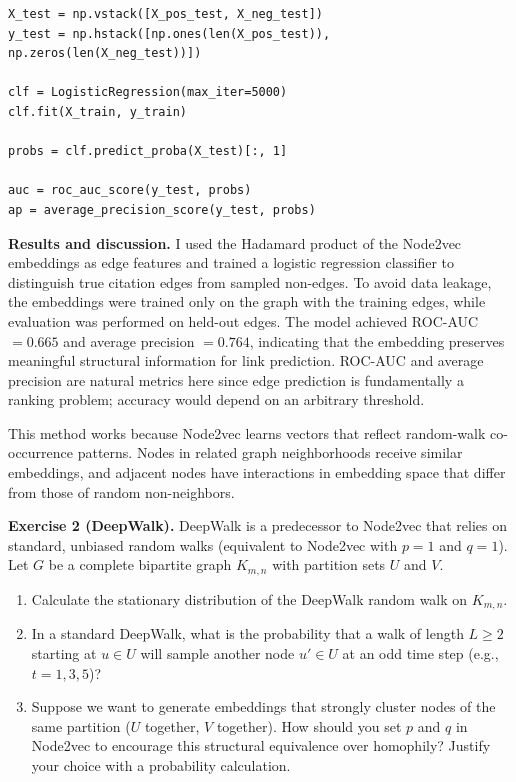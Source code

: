 \documentclass{article}
\begin{document}
\begin{tcolorbox}[colback=white, colframe=black!75, breakable, title=\textbf{Solution to Exercise 1}]
\begin{lstlisting}[style=python2]
X_test = np.vstack([X_pos_test, X_neg_test])
y_test = np.hstack([np.ones(len(X_pos_test)), np.zeros(len(X_neg_test))])

clf = LogisticRegression(max_iter=5000)
clf.fit(X_train, y_train)

probs = clf.predict_proba(X_test)[:, 1]

auc = roc_auc_score(y_test, probs)
ap = average_precision_score(y_test, probs)
\end{lstlisting}

\medskip
\textbf{Results and discussion.} I used the Hadamard product of the Node2vec embeddings as edge features and trained a logistic regression classifier to distinguish true citation edges from sampled non-edges. To avoid data leakage, the embeddings were trained only on the graph with the training edges, while evaluation was performed on held-out edges. The model achieved ROC-AUC $= 0.665$ and average precision $= 0.764$, indicating that the embedding preserves meaningful structural information for link prediction. ROC-AUC and average precision are natural metrics here since edge prediction is fundamentally a ranking problem; accuracy would depend on an arbitrary threshold.

This method works because Node2vec learns vectors that reflect random-walk co-occurrence patterns. Nodes in related graph neighborhoods receive similar embeddings, and adjacent nodes have interactions in embedding space that differ from those of random non-neighbors.
\end{tcolorbox}

\vspace{8pt}

\begin{tcolorbox}[colback = gray!16, enhanced, boxrule=0pt, frame hidden, sharp corners, borderline west={3pt}{-1.5pt}{black!80}, breakable]
\textbf{Exercise 2 (DeepWalk).} DeepWalk is a predecessor to Node2vec that relies on standard, unbiased random walks (equivalent to Node2vec with $p=1$ and $q=1$). Let $G$ be a complete bipartite graph $K_{m,n}$ with partition sets $U$ and $V$.
\begin{enumerate}[$(a)$]
    \item Calculate the stationary distribution of the DeepWalk random walk on $K_{m,n}$.
    \item In a standard DeepWalk, what is the probability that a walk of length $L \ge 2$ starting at $u \in U$ will sample another node $u' \in U$ at an odd time step (e.g., $t=1, 3, 5$)?
    \item Suppose we want to generate embeddings that strongly cluster nodes of the same partition ($U$ together, $V$ together). How should you set $p$ and $q$ in Node2vec to encourage this structural equivalence over homophily? Justify your choice with a probability calculation.
\end{enumerate}
\end{tcolorbox}
\end{document}
